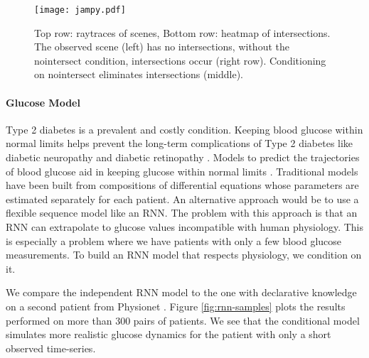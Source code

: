 
\begin{figure}
	\centering
	\texttt{[image: jampy.pdf]}
	\caption{ Top row: raytraces of scenes, Bottom row: heatmap of intersections.  The observed scene (left) has no intersections, without the $\textrm{nointersect}$ condition, intersections occur  (right row).  Conditioning on $\textrm{nointersect}$ eliminates intersections (middle).}
	\label{fig:invrtmcmc}
\end{figure}


\paragraph{Glucose Model}
Type 2 diabetes is a prevalent and costly condition.
Keeping blood glucose within normal limits helps prevent the
long-term complications of Type 2 diabetes like diabetic neuropathy and diabetic retinopathy \citep{brownlee2006glycemic}. Models to predict the trajectories of blood glucose aid in keeping glucose within
normal limits \citep{zeevi2015personalized}. Traditional models have been built from compositions of differential equations \citep{albers2017personalized,levine2017offline} whose parameters are estimated separately for each patient. An alternative approach would be to use a flexible sequence model like an RNN. The problem with this approach is that an RNN can extrapolate to glucose values incompatible with human physiology. This is especially a problem where we have patients with only a few blood glucose measurements. To build an RNN model that respects physiology, we condition on it.

We compare the independent RNN model to the one with declarative knowledge on a second patient from Physionet \citep{moody2001physionet}.
Figure \ref{fig:rnn-samples} plots the results performed on more than 300 pairs of patients.
We see that the conditional model simulates
more realistic glucose dynamics for the patient 
with only a short observed time-series.



